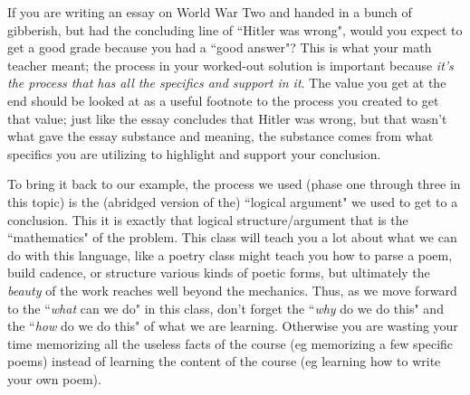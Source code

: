 {If you are writing an essay on World War Two and handed in a bunch of gibberish, but had the concluding line of ``Hitler was wrong", would you expect to get a good grade because you had a ``good answer"? This is what your math teacher meant; the process in your worked-out solution is important because \textit{it's the process that has all the specifics and support in it}. The value you get at the end should be looked at as a useful footnote to the process you created to get that value; just like the essay concludes that Hitler was wrong, but that wasn't what gave the essay substance and meaning, the substance comes from what specifics you are utilizing to highlight and support your conclusion.

To bring it back to our example, the process we used (phase one through three in this topic) is the (abridged version of the) ``logical argument" we used to get to a conclusion. This it is exactly that logical structure/argument that is the ``mathematics" of the problem. This class will teach you a lot about what we can do with this language, like a poetry class might teach you how to parse a poem, build cadence, or structure various kinds of poetic forms, but ultimately the \textit{beauty} of the work reaches well beyond the mechanics. Thus, as we move forward to the ``\textit{what} can we do" in this class, don't forget the ``\textit{why} do we do this" and the ``\textit{how} do we do this" of what we are learning. Otherwise you are wasting your time memorizing all the useless facts of the course (eg memorizing a few specific poems) instead of learning the content of the course (eg learning how to write your own poem).}

